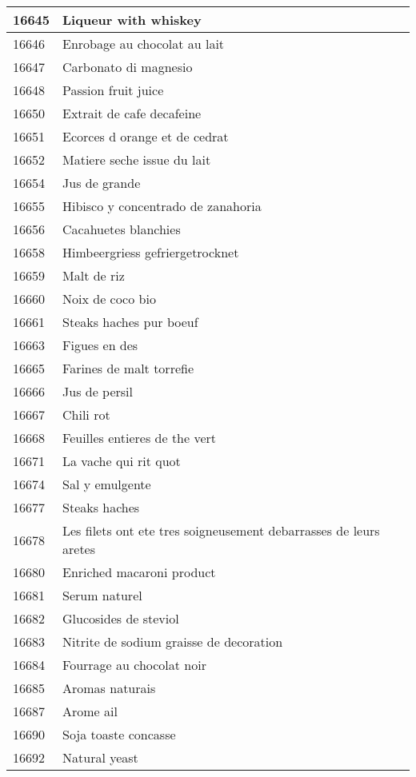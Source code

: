 \begin{longtable}{|l|l|}
16645 & Liqueur with whiskey \\ \hline 
16646 & Enrobage au chocolat au lait \\ \hline 
16647 & Carbonato di magnesio \\ \hline 
16648 & Passion fruit juice \\ \hline 
16650 & Extrait de cafe decafeine \\ \hline 
16651 & Ecorces d orange et de cedrat \\ \hline 
16652 & Matiere seche issue du lait \\ \hline 
16654 & Jus de grande \\ \hline 
16655 & Hibisco y concentrado de zanahoria \\ \hline 
16656 & Cacahuetes blanchies \\ \hline 
16658 & Himbeergriess gefriergetrocknet \\ \hline 
16659 & Malt de riz \\ \hline 
16660 & Noix de coco bio \\ \hline 
16661 & Steaks haches pur boeuf \\ \hline 
16663 & Figues en des \\ \hline 
16665 & Farines de malt torrefie \\ \hline 
16666 & Jus de persil \\ \hline 
16667 & Chili rot \\ \hline 
16668 & Feuilles entieres de the vert \\ \hline 
16671 & La vache qui rit quot \\ \hline 
16674 & Sal y emulgente \\ \hline 
16677 & Steaks haches \\ \hline 
16678 & Les filets ont ete tres soigneusement debarrasses de leurs aretes \\ \hline 
16680 & Enriched macaroni product \\ \hline 
16681 & Serum naturel \\ \hline 
16682 & Glucosides de steviol \\ \hline 
16683 & Nitrite de sodium graisse de decoration \\ \hline 
16684 & Fourrage au chocolat noir \\ \hline 
16685 & Aromas naturais \\ \hline 
16687 & Arome ail \\ \hline 
16690 & Soja toaste concasse \\ \hline 
16692 & Natural yeast \\ \hline 

\end{longtable}

